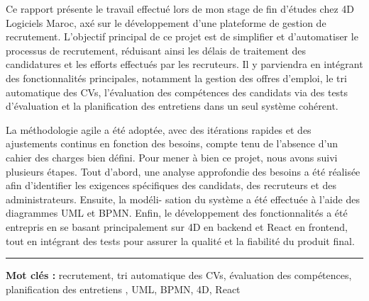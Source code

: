 \begin{spacing}{1.25}

Ce rapport présente le travail effectué lors de mon stage de fin d’études 
chez 4D Logiciels Maroc, axé sur le développement 
d’une plateforme de gestion de recrutement. L'objectif principal 
de ce projet est de simplifier et d'automatiser le processus de recrutement,
réduisant ainsi les délais de traitement des candidatures et les efforts effectués par les recruteurs. 
Il y parviendra en intégrant des fonctionnalités principales, notamment la 
gestion des offres d'emploi, le tri automatique des CVs, l'évaluation des compétences des candidats via des tests d'évaluation 
et la planification des entretiens dans un seul système 
cohérent.
\newline

La méthodologie agile 
a été adoptée, avec des itérations rapides et des ajustements 
continus en fonction des besoins, compte tenu de l'absence 
d'un cahier des charges bien défini. 
Pour mener à bien ce projet, nous avons suivi plusieurs étapes. 
Tout d’abord, une analyse approfondie des besoins a été réalisée 
afin d'identifier les exigences spécifiques des candidats, 
des recruteurs et des administrateurs. Ensuite, la modéli-
sation 
du système a été effectuée à l’aide des diagrammes UML et BPMN. 
Enfin, le développement des fonctionnalités a été entrepris en se 
basant principalement sur 4D en backend et React en frontend, tout en 
intégrant des tests pour assurer la qualité et la fiabilité du produit final.

\end{spacing}

\vspace{1cm}
\noindent\rule[2pt]{\textwidth}{0.5pt}

{\textbf{Mot clés :} 
recrutement,
tri automatique des CVs,
évaluation des compétences, planification des entretiens
, UML, BPMN, 4D, React}
\\

